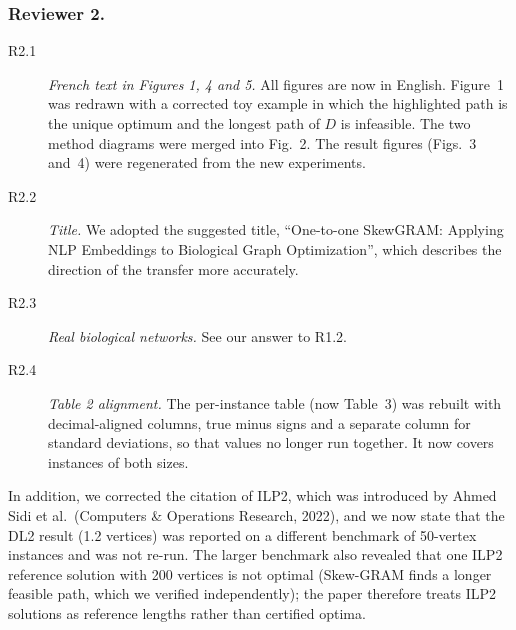 \documentclass{llncs}
\begin{document}
\subsubsection{Reviewer 2.}

\begin{description}
\item[R2.1] \emph{French text in Figures 1, 4 and 5.} All figures are now in English. Figure~1 was redrawn with a corrected toy example in which the highlighted path is the unique optimum and the longest path of $D$ is infeasible. The two method diagrams were merged into Fig.~2. The result figures (Figs.~3 and~4) were regenerated from the new experiments.

\item[R2.2] \emph{Title.} We adopted the suggested title, ``One-to-one SkewGRAM: Applying NLP Embeddings to Biological Graph Optimization'', which describes the direction of the transfer more accurately.

\item[R2.3] \emph{Real biological networks.} See our answer to R1.2.

\item[R2.4] \emph{Table 2 alignment.} The per-instance table (now Table~3) was rebuilt with decimal-aligned columns, true minus signs and a separate column for standard deviations, so that values no longer run together. It now covers instances of both sizes.
\end{description}

In addition, we corrected the citation of ILP2, which was introduced by Ahmed Sidi et al.\ (Computers \& Operations Research, 2022), and we now state that the DL2 result (1.2 vertices) was reported on a different benchmark of 50-vertex instances and was not re-run. The larger benchmark also revealed that one ILP2 reference solution with 200 vertices is not optimal (Skew-GRAM finds a longer feasible path, which we verified independently); the paper therefore treats ILP2 solutions as reference lengths rather than certified optima.
\end{document}
